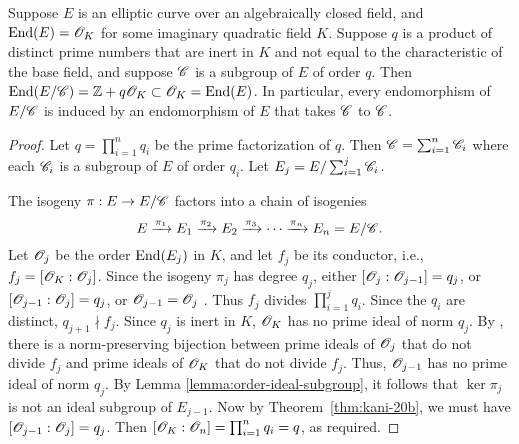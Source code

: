 \documentclass{amsart}
\begin{document}
\begin{lemma}\label{lem:c-end}
  Suppose $E$ is an elliptic curve over an algebraically closed field, and $\operatorname{End}(E) = \mathscr{O}_K$ for some imaginary quadratic field $K$. Suppose $q$ is a product of distinct prime numbers that are inert in $K$ and not equal to the characteristic of the base field, and suppose $\mathscr{C}$ is a subgroup of $E$ of order $q$. Then $\operatorname{End}(E/\mathscr{C}) = \mathbb{Z} + q\mathscr{O}_K \subset \mathscr{O}_K = \operatorname{End}(E)$. In particular, every endomorphism of $E/\mathscr{C}$ is induced by an endomorphism of $E$ that takes $\mathscr{C}$ to $\mathscr{C}$.
\end{lemma}
\begin{proof}
  Let $q = \prod_{i=1}^n q_i$ be the prime factorization of $q$.
  Then $\mathscr{C} = \sum_{i=1}^n \mathscr{C}_i$ where each $\mathscr{C}_i$ is a subgroup of $E$ of order $q_i$. Let $E_j = E/\sum_{i=1}^j\mathscr{C}_i$.
 
  The isogeny $\pi: E \to E/\mathscr{C}$ factors into a chain of isogenies
   \[
    E
    \xrightarrow{\pi_1}
    E_1
    \xrightarrow{\pi_2}
    E_2
    \xrightarrow{\pi_3}
    \cdots
    \xrightarrow{\pi_n}
    E_n = E/\mathscr{C}.
  \]
  Let $\mathscr{O}_j$ be the order $\operatorname{End}(E_j)$ in $K$, and let $f_j$ be its conductor, i.e., $f_j = [\mathscr{O}_{K} : \mathscr{O}_j]$. Since the isogeny $\pi_j$ has degree $q_j$, either $[\mathscr{O}_j : \mathscr{O}_{j-1}] = q_j$, or $[\mathscr{O}_{j-1} : \mathscr{O}_j] = q_j$, or $\mathscr{O}_{j-1} = \mathscr{O}_j$ \cite[Prop.~5]{kohel1996endomorphism}. Thus $f_j$ divides $\prod_{i=1}^{j}q_i$. Since the $q_i$ are distinct, $q_{j+1} \nmid f_j$. 
  Since $q_j$ is inert in $K$, $\mathscr{O}_K$ has no prime ideal of norm $q_j$. By \cite[Prop.~7.20]{cox2011primes}, there is a norm-preserving bijection between prime ideals of $\mathscr{O}_{j}$ that do not divide $f_{j}$ and prime ideals of $\mathscr{O}_K$ that do not divide $f_{j}$. Thus, $\mathscr{O}_{j-1}$ has no prime ideal of norm $q_j$. 
By Lemma \ref{lemma:order-ideal-subgroup}, it follows that $\ker\pi_j$ is not an ideal subgroup of $E_{j-1}$. %
Now by Theorem~\ref{thm:kani-20b}, we must have $[\mathscr{O}_{j-1} : \mathscr{O}_j] = q_j$. Then $[\mathscr{O}_K : \mathscr{O}_n] = \prod_{i=1}^n q_i = q$, as required.
\end{proof}
\end{document}

